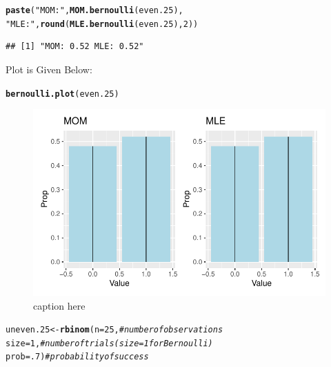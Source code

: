 \documentclass{article}\usepackage[]{graphicx}\usepackage[]{color}
\makeatletter
\def\maxwidth{ %
  \ifdim\Gin@nat@width>\linewidth
    \linewidth
  \else
    \Gin@nat@width
  \fi
}
\newcommand{\hlnum}[1]{\textcolor[rgb]{0.686,0.059,0.569}{#1}}%
\newcommand{\hlstr}[1]{\textcolor[rgb]{0.192,0.494,0.8}{#1}}%
\newcommand{\hlcom}[1]{\textcolor[rgb]{0.678,0.584,0.686}{\textit{#1}}}%
\newcommand{\hlstd}[1]{\textcolor[rgb]{0.345,0.345,0.345}{#1}}%
\newcommand{\hlkwb}[1]{\textcolor[rgb]{0.69,0.353,0.396}{#1}}%
\newcommand{\hlkwc}[1]{\textcolor[rgb]{0.333,0.667,0.333}{#1}}%
\newcommand{\hlkwd}[1]{\textcolor[rgb]{0.737,0.353,0.396}{\textbf{#1}}}%
\newenvironment{kframe}{%
 \def\at@end@of@kframe{}%
 \ifinner\ifhmode%
  \def\at@end@of@kframe{\end{minipage}}%
  \begin{minipage}{\columnwidth}%
 \fi\fi%
 \def\FrameCommand##1{\hskip\@totalleftmargin \hskip-\fboxsep
 \colorbox{shadecolor}{##1}\hskip-\fboxsep
     \hskip-\linewidth \hskip-\@totalleftmargin \hskip\columnwidth}%
 \MakeFramed {\advance\hsize-\width
   \@totalleftmargin\z@ \linewidth\hsize
   \@setminipage}}%
 {\par\unskip\endMakeFramed%
 \at@end@of@kframe}
\newenvironment{knitrout}{}{} %
\makeatother
\begin{document}
\begin{enumerate}
\begin{enumerate}
\begin{knitrout}
\begin{kframe}
\begin{alltt}
\hlkwd{paste}\hlstd{(}\hlstr{"MOM:"}\hlstd{,} \hlkwd{MOM.bernoulli}\hlstd{(even.25),}
      \hlstr{"MLE:"}\hlstd{,} \hlkwd{round}\hlstd{(}\hlkwd{MLE.bernoulli}\hlstd{(even.25),}\hlnum{2}\hlstd{))}
\end{alltt}
\begin{verbatim}
## [1] "MOM: 0.52 MLE: 0.52"
\end{verbatim}
\end{kframe}
\end{knitrout}
Plot is Given Below:
\begin{knitrout}
\color{fgcolor}\begin{kframe}
\begin{alltt}
\hlkwd{bernoulli.plot}\hlstd{(even.25)}
\end{alltt}
\end{kframe}
\end{knitrout}
\begin{figure}[H]
  \begin{center}
\begin{knitrout}
\color{fgcolor}
\includegraphics[width=\maxwidth]{figure/unnamed-chunk-8-1} 
\end{knitrout}
    \caption{caption here}
    \label{p4plot3}%
  \end{center}
\end{figure}
\begin{knitrout}
\color{fgcolor}\begin{kframe}
\begin{alltt}
\hlstd{uneven.25} \hlkwb{<-} \hlkwd{rbinom}\hlstd{(}\hlkwc{n}\hlstd{=}\hlnum{25}\hlstd{,}        \hlcom{#number of observations}
                    \hlkwc{size}\hlstd{=}\hlnum{1}\hlstd{,}        \hlcom{#number of trials (size=1 for Bernoulli)}
                    \hlkwc{prob}\hlstd{=}\hlnum{.7}\hlstd{)}       \hlcom{#probability of success}


\end{alltt}
\end{kframe}
\end{knitrout}
\end{enumerate}
\end{enumerate}
\end{document}
